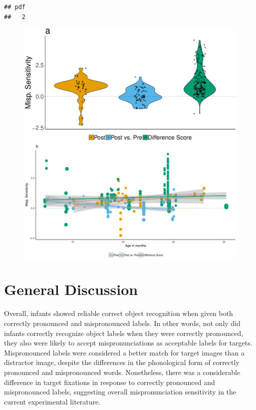 \documentclass[man]{apa6}
\theoremstyle{definition}
\theoremstyle{definition}
\theoremstyle{definition}
\theoremstyle{remark}
\begin{document}
\begin{verbatim}
## pdf 
##   2
\end{verbatim}

\begin{figure}
\centering
\includegraphics{Paper_Analyses_files/figure-latex/Plot_Within_cond_age_diff_score-1.pdf}
\caption{}
\end{figure}

\section{General Discussion}\label{general-discussion}

Overall, infants showed reliable correct object recognition when given
both correctly pronounced and mispronounced labels. In other words, not
only did infants correctly recognize object labels when they were
correctly pronounced, they also were likely to accept mispronunciations
as acceptable labels for targets. Mispronounced labels were considered a
better match for target images than a distractor image, despite the
differences in the phonological form of correctly pronounced and
mispronounced words. Nonetheless, there was a considerable difference in
target fixations in response to correctly pronounced and mispronounced
labels, suggesting overall mispronunciation sensitivity in the current
experimental literature.
\end{document}
